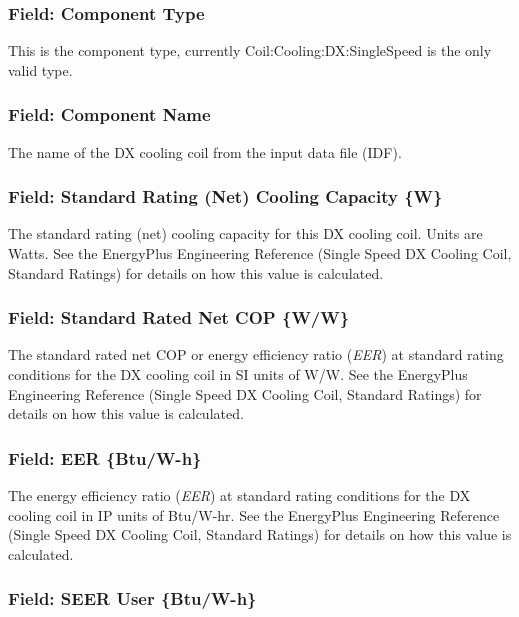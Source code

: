 \subsubsection{Field: Component Type}\label{field-component-type-3}

This is the component type, currently Coil:Cooling:DX:SingleSpeed is the only valid type.

\subsubsection{Field: Component Name}\label{field-component-name-3}

The name of the DX cooling coil from the input data file (IDF).

\subsubsection{Field: Standard Rating (Net) Cooling Capacity \{W\}}\label{field-standard-rating-net-cooling-capacity-w}

The standard rating (net) cooling capacity for this DX cooling coil. Units are Watts. See the EnergyPlus Engineering Reference (Single Speed DX Cooling Coil, Standard Ratings) for details on how this value is calculated.

\subsubsection{Field: Standard Rated Net COP \{W/W\}}\label{field-standard-rated-net-cop-ww}

The standard rated net COP or energy efficiency ratio (\emph{EER}) at standard rating conditions for the DX cooling coil in SI units of W/W. See the EnergyPlus Engineering Reference (Single Speed DX Cooling Coil, Standard Ratings) for details on how this value is calculated.

\subsubsection{Field: EER \{Btu/W-h\}}\label{field-eer-btuw-h}

The energy efficiency ratio (\emph{EER}) at standard rating conditions for the DX cooling coil in IP units of Btu/W-hr. See the EnergyPlus Engineering Reference (Single Speed DX Cooling Coil, Standard Ratings) for details on how this value is calculated.

\subsubsection{Field: SEER User \{Btu/W-h\}}

